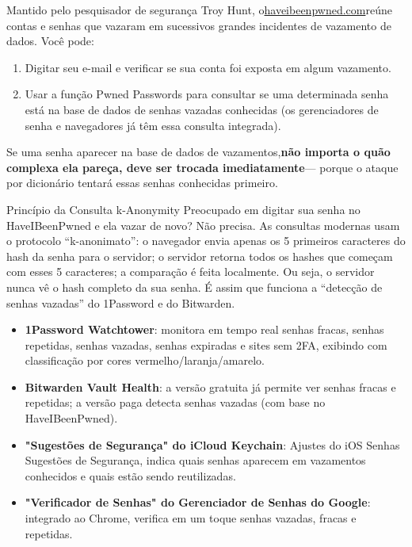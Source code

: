 
Mantido pelo pesquisador de segurança Troy Hunt, o\href{https://haveibeenpwned.com}{haveibeenpwned.com}reúne contas e senhas que vazaram em sucessivos grandes incidentes de vazamento de dados. Você pode:

\begin{enumerate}
  \item Digitar seu e-mail e verificar se sua conta foi exposta em algum vazamento.
  \item Usar a função Pwned Passwords para consultar se uma determinada senha está na base de dados de senhas vazadas conhecidas (os gerenciadores de senha e navegadores já têm essa consulta integrada).
\end{enumerate}

Se uma senha aparecer na base de dados de vazamentos,\textbf{não importa o quão complexa ela pareça, deve ser trocada imediatamente}— porque o ataque por dicionário tentará essas senhas conhecidas primeiro.

\begin{tcbinfo}{Princípio da Consulta k-Anonymity}
Preocupado em digitar sua senha no HaveIBeenPwned e ela vazar de novo? Não precisa. As consultas modernas usam o protocolo “k-anonimato”: o navegador envia apenas os 5 primeiros caracteres do hash da senha para o servidor; o servidor retorna todos os hashes que começam com esses 5 caracteres; a comparação é feita localmente. Ou seja, o servidor nunca vê o hash completo da sua senha. É assim que funciona a “detecção de senhas vazadas” do 1Password e do Bitwarden.

\end{tcbinfo}


\begin{itemize}
  \item \textbf{1Password Watchtower}: monitora em tempo real senhas fracas, senhas repetidas, senhas vazadas, senhas expiradas e sites sem 2FA, exibindo com classificação por cores vermelho/laranja/amarelo.
  \item \textbf{Bitwarden Vault Health}: a versão gratuita já permite ver senhas fracas e repetidas; a versão paga detecta senhas vazadas (com base no HaveIBeenPwned).
  \item \textbf{"Sugestões de Segurança" do iCloud Keychain}: Ajustes do iOS Senhas Sugestões de Segurança, indica quais senhas aparecem em vazamentos conhecidos e quais estão sendo reutilizadas.
  \item \textbf{"Verificador de Senhas" do Gerenciador de Senhas do Google}: integrado ao Chrome, verifica em um toque senhas vazadas, fracas e repetidas.
\end{itemize}

